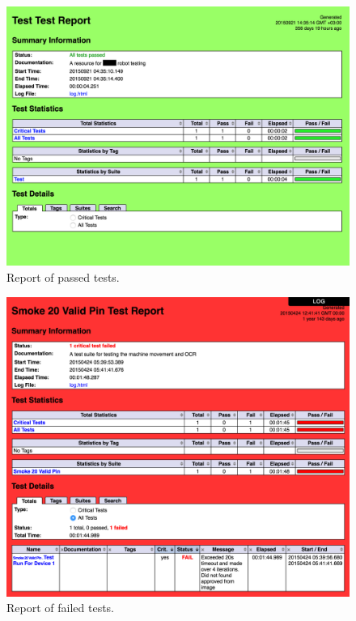 \begin{figure}[ht]
  \begin{center}
    \includegraphics[width=\textwidth]{images/passed_report.png}
    \caption{Report of passed tests.}
    \label{fig:passed report}
  \end{center}
\end{figure}
\FloatBarrier

\begin{figure}[ht]
  \begin{center}
    \includegraphics[width=\textwidth]{images/failed_report.png}
    \caption{Report of failed tests.}
    \label{fig:failed report}
  \end{center}
\end{figure}
\FloatBarrier